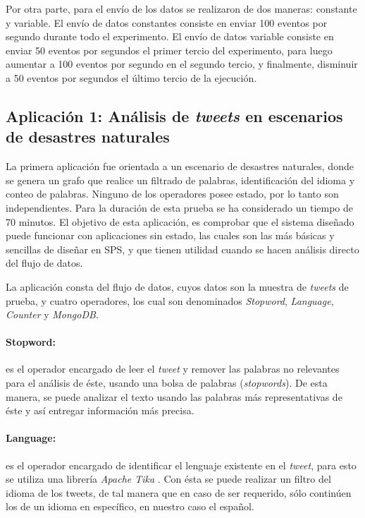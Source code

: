Por otra parte, para el envío de los datos se realizaron de dos maneras: constante y variable. El envío de datos constantes consiste en enviar 100 eventos por segundo durante todo el experimento. El envío de datos variable consiste en enviar 50 eventos por segundos el primer tercio del experimento, para luego aumentar a 100 eventos por segundo en el segundo tercio, y finalmente, disminuir a 50 eventos por segundos el último tercio de la ejecución.

\subsection{Aplicación 1: Análisis de \textit{tweets} en escenarios de desastres naturales}
La primera aplicación fue orientada a un escenario de desastres naturales, donde se genera un grafo que realice un filtrado de palabras, identificación del idioma y conteo de palabras. Ninguno de los operadores posee estado, por lo tanto son independientes. Para la duración de esta prueba se ha considerado un tiempo de 70 minutos. El objetivo de esta aplicación, es comprobar que el sistema diseñado puede funcionar con aplicaciones sin estado, las cuales son las más básicas y sencillas de diseñar en SPS, y que tienen utilidad cuando se hacen análisis directo del flujo de datos.

La aplicación consta del flujo de datos, cuyos datos son la muestra de \textit{tweets} de prueba, y cuatro operadores, los cual son denominados \textit{Stopword}, \textit{Language}, \textit{Counter} y \textit{MongoDB}.

\paragraph{Stopword:} es el operador encargado de leer el \textit{tweet} y remover las palabras no relevantes para el análisis de éste, usando una bolsa de palabras (\textit{stopwords}). De esta manera, se puede analizar el texto usando las palabras más representativas de éste y así entregar información más precisa.

\paragraph{Language:} es el operador encargado de identificar el lenguaje existente en el \textit{tweet}, para esto se utiliza una librería \textit{Apache Tika} \citep{mattmann2011tika}. Con ésta se puede realizar un filtro del idioma de los tweets, de tal manera que en caso de ser requerido, sólo continúen los de un idioma en específico, en nuestro caso el español.

